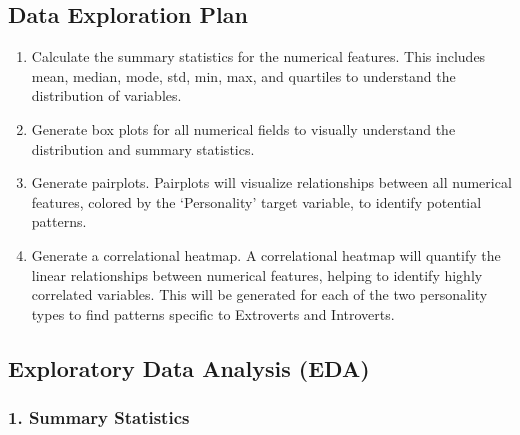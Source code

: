 \documentclass[
]{article}
\providecommand{\tightlist}{%
  \setlength{\itemsep}{0pt}\setlength{\parskip}{0pt}}
\begin{document}
\hypertarget{data-exploration-plan}{%
\subsection{Data Exploration Plan}\label{data-exploration-plan}}

\begin{enumerate}
\def\labelenumi{\arabic{enumi}.}
\tightlist
\item
  Calculate the summary statistics for the numerical features. This
  includes mean, median, mode, std, min, max, and quartiles to
  understand the distribution of variables.
\item
  Generate box plots for all numerical fields to visually understand the
  distribution and summary statistics.
\item
  Generate pairplots. Pairplots will visualize relationships between all
  numerical features, colored by the `Personality' target variable, to
  identify potential patterns.
\item
  Generate a correlational heatmap. A correlational heatmap will
  quantify the linear relationships between numerical features, helping
  to identify highly correlated variables. This will be generated for
  each of the two personality types to find patterns specific to
  Extroverts and Introverts.
\end{enumerate}

\hypertarget{exploratory-data-analysis-eda}{%
\subsection{Exploratory Data Analysis
(EDA)}\label{exploratory-data-analysis-eda}}

\hypertarget{summary-statistics}{%
\subsubsection{1. Summary Statistics}\label{summary-statistics}}
\end{document}
